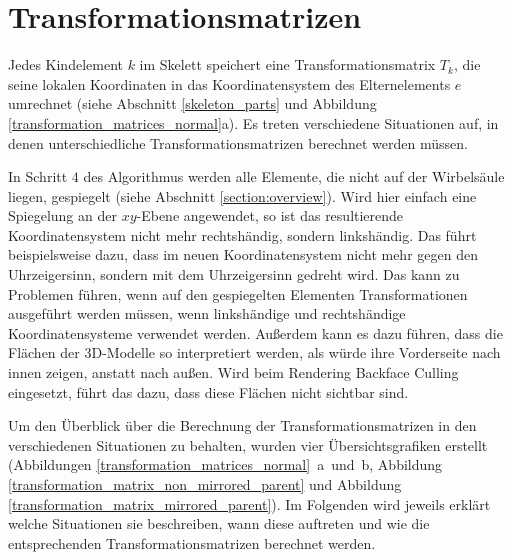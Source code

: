 \section{Transformationsmatrizen}
\label{implementation_detail_matrices}

Jedes Kindelement $k$ im Skelett speichert eine Transformationsmatrix $T_k$, die seine lokalen Koordinaten in das Koordinatensystem des Elternelements $e$ umrechnet (siehe Abschnitt \ref{skeleton_parts} und Abbildung \ref{transformation_matrices_normal}a).
Es treten verschiedene Situationen auf, in denen unterschiedliche Transformationsmatrizen berechnet werden müssen.

In Schritt $4$ des Algorithmus werden \zb alle Elemente, die nicht auf der Wirbelsäule liegen, gespiegelt (siehe Abschnitt \ref{section:overview}). Wird hier einfach eine Spiegelung an der $xy$-Ebene angewendet, so ist das resultierende Koordinatensystem nicht mehr rechtshändig, sondern linkshändig.
Das führt beispielsweise dazu, dass im neuen Koordinatensystem nicht mehr gegen den Uhrzeigersinn, sondern mit dem Uhrzeigersinn gedreht wird. Das kann zu Problemen führen, wenn auf den gespiegelten Elementen Transformationen ausgeführt werden müssen, \va wenn linkshändige und rechtshändige Koordinatensysteme verwendet werden. Außerdem kann es dazu führen, dass die Flächen der 3D-Modelle so interpretiert werden, als würde ihre Vorderseite nach innen zeigen, anstatt nach außen. Wird beim Rendering Backface Culling \cite{backfaceCulling} eingesetzt, führt das dazu, dass diese Flächen nicht sichtbar sind.

Um den Überblick über die Berechnung der Transformationsmatrizen in den verschiedenen Situationen zu behalten, wurden vier Übersichtsgrafiken erstellt (Abbildungen \mbox{\ref{transformation_matrices_normal} a und b}, Abbildung \ref{transformation_matrix_non_mirrored_parent} und Abbildung \ref{transformation_matrix_mirrored_parent}). 
Im Folgenden wird jeweils erklärt welche Situationen sie beschreiben, wann diese auftreten und wie die entsprechenden Transformationsmatrizen berechnet werden.

